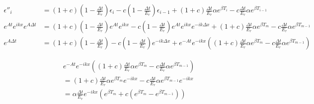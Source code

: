 \documentclass[12pt]{article}
\begin{document}
\begin{align*}
\epsilon''_i &= \left(1+c\right)\left(1-\frac{\Delta t}{E_r}\right)\epsilon_i - c\left(1-\frac{\Delta t}{E_r}\right)\epsilon_{i-1}
	+ \left(1+c\right)\frac{\Delta t}{E_r}\alpha e^{\beta T_i} - c\frac{\Delta t}{E_r}\alpha e^{\beta T_{i-1}} \\
e^{At}e^{ikx}e^{A\Delta t} &= \left(1+c\right)\left(1-\frac{\Delta t}{E_r}\right)e^{At}e^{ikx}
	-c\left(1-\frac{\Delta t}{E_r}\right)e^{At}e^{ikx}e^{-ik\Delta x}
	+\left(1+c\right)\frac{\Delta t}{E_r}\alpha e^{\beta T_m}
	-c\frac{\Delta t}{E_r}\alpha e^{\beta T_{m-1}} \\
e^{A\Delta t} &= \left(1+c\right)\left(1-\frac{\Delta t}{E_r}\right)
	-c\left(1-\frac{\Delta t}{E_r}\right)e^{-ik\Delta x}
	+e^{-At}e^{-ikx}\left(\left(1+c\right)\frac{\Delta t}{E_r}\alpha e^{\beta T_m}
	-c\frac{\Delta t}{E_r}\alpha e^{\beta T_{m-1}}\right)
\end{align*}

\begin{align*}
& e^{-At}e^{-ikx}\left(\left(1+c\right)\frac{\Delta t}{E_r}\alpha e^{\beta T_m}-c\frac{\Delta t}{E_r}\alpha e^{\beta T_{m-1}}\right) \\
&= \left(1+c\right)\frac{\Delta t}{E_r}\alpha e^{\beta T_m}e^{-ikx}
	-c\frac{\Delta t}{E_r}\alpha e^{\beta T_{m-1}}e^{-ikx} \\
&= \alpha\frac{\Delta t}{E_r}e^{-ikx}\left(e^{\beta T_m}+c\left(e^{\beta T_m}-e^{\beta T_{m-1}}\right)\right)
\end{align*}
\end{document}

